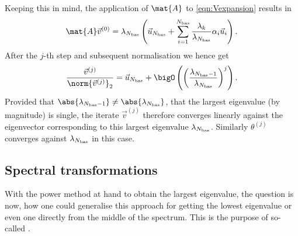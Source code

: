Keeping this in mind, the application of $\mat{A}$ to \eqref{eqn:Vexpansion}
results in
\[
	\mat{A} \vec{v}^{(0)} = \lambda_{\Nbas} \left( \vec{u}_{\Nbas} + \sum_{i=1}^{\Nbas}
	\frac{\lambda_k}{\lambda_{\Nbas}}
	\alpha_i \vec{u}_i \right).
\]
After the $j$-th step and subsequent normalisation we hence get
\[
	\frac{\vec{v}^{(j)}}{\norm{\vec{v}^{(j)}}_2} =
	\vec{u}_{\Nbas} + \bigO\left(
	\left( \frac{\lambda_{\Nbas-1}}{\lambda_{\Nbas}} \right)^j
	\right).
\]
Provided that $\abs{\lambda_{\Nbas-1}} \neq \abs{\lambda_{\Nbas}}$,
\ie that the largest eigenvalue (by magnitude) is single,
the iterate $\vec{v}^{(j)}$
therefore converges linearly against the eigenvector corresponding to this
largest eigenvalue $\lambda_{N_\text{bas}}$.
Similarly $\theta^{(j)}$ converges against $\lambda_{N_\text{bas}}$ in this case.


\subsection{Spectral transformations}
\label{sec:ShiftInvert}
With the power method at hand to obtain the largest eigenvalue,
the question is now,
how one could generalise this approach
for getting the lowest eigenvalue or even one directly from the middle
of the spectrum.
This is the purpose of so-called .


